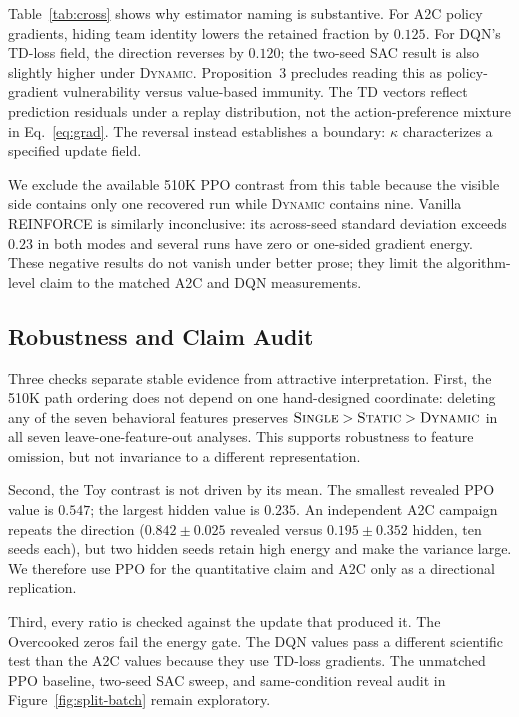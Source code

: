 \documentclass[letterpaper]{article}
\begin{document}
Table~\ref{tab:cross} shows why estimator naming is substantive.
For A2C policy gradients, hiding team identity lowers the retained fraction by $0.125$.
For DQN's TD-loss field, the direction reverses by $0.120$; the two-seed SAC result is also slightly higher under \textsc{Dynamic}.
Proposition~3 precludes reading this as policy-gradient vulnerability versus value-based immunity.
The TD vectors reflect prediction residuals under a replay distribution, not the action-preference mixture in Eq.~\eqref{eq:grad}.
The reversal instead establishes a boundary: $\kappa$ characterizes a specified update field.

We exclude the available 510K PPO contrast from this table because the visible side contains only one recovered run while \textsc{Dynamic} contains nine.
Vanilla REINFORCE is similarly inconclusive: its across-seed standard deviation exceeds $0.23$ in both modes and several runs have zero or one-sided gradient energy.
These negative results do not vanish under better prose; they limit the algorithm-level claim to the matched A2C and DQN measurements.

\subsection{Robustness and Claim Audit}

Three checks separate stable evidence from attractive interpretation.
First, the 510K path ordering does not depend on one hand-designed coordinate:
deleting any of the seven behavioral features preserves
$\textsc{Single}>\textsc{Static}>\textsc{Dynamic}$ in all seven leave-one-feature-out analyses.
This supports robustness to feature omission, but not invariance to a different representation.

Second, the Toy contrast is not driven by its mean.
The smallest revealed PPO value is $0.547$; the largest hidden value is $0.235$.
An independent A2C campaign repeats the direction
($0.842\pm0.025$ revealed versus $0.195\pm0.352$ hidden, ten seeds each), but two hidden seeds retain high energy and make the variance large.
We therefore use PPO for the quantitative claim and A2C only as a directional replication.

Third, every ratio is checked against the update that produced it.
The Overcooked zeros fail the energy gate.
The DQN values pass a different scientific test than the A2C values because they use TD-loss gradients.
The unmatched PPO baseline, two-seed SAC sweep, and same-condition reveal
audit in Figure~\ref{fig:split-batch} remain exploratory.
\end{document}
